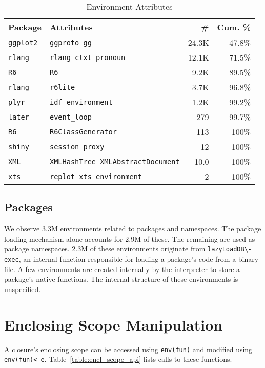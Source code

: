 \documentclass[10pt,sigplan,authorversion=true]{acmart}
\renewcommand{\c}[1]{\lstinline |#1|\xspace}
\begin{document}
\begin{table}[!h]
  \small
  \caption{Environment Attributes} \label{table:explicit_env_attr}
  \centering
  \begin{tabular}{@{}ll@{}rr@{}}
    \toprule
    \textbf{Package}&\textbf{Attributes}&\textbf{\#}&\textbf{Cum. \%}\\
    \midrule
    \texttt{ggplot2}&\texttt{ggproto gg}&24.3K&47.8\%\\
    \texttt{rlang}&\texttt{rlang\_ctxt\_pronoun}&12.1K&71.5\%\\
    \texttt{R6}&\texttt{R6}&9.2K&89.5\%\\
    \texttt{rlang}&\texttt{r6lite}&3.7K&96.8\%\\
    \texttt{plyr}&\texttt{idf environment}&1.2K&99.2\%\\
    \texttt{later}&\texttt{event\_loop}&279&99.7\%\\
    \texttt{R6}&\texttt{R6ClassGenerator}&113&100\%\\
    \texttt{shiny}&\texttt{session\_proxy}&12&100\%\\
    \texttt{XML}&\texttt{XMLHashTree XMLAbstractDocument}&10.0&100\%\\
    \texttt{xts}&\texttt{replot\_xts environment}&2&100\%\\
    \bottomrule
  \end{tabular}
\end{table}


\subsection{Packages}

We observe 3.3M environments related to packages and namespaces. The package
loading mechanism alone accounts for 2.9M of these. The remaining are used as
package namespaces. 2.3M of these environments originate from
\c{lazyLoadDB\-exec}, an internal function responsible for loading a package's
code from a binary file. A few environments are created internally by the
interpreter to store a package's native functions. The internal structure of
these environments is unspecified.

\section{Enclosing Scope Manipulation}

A closure's enclosing scope can be accessed using \c{env(fun)} and modified
using \c{env(fun)<-e}. Table~\ref{table:encl_scope_api} lists calls to these
functions.
\end{document}
